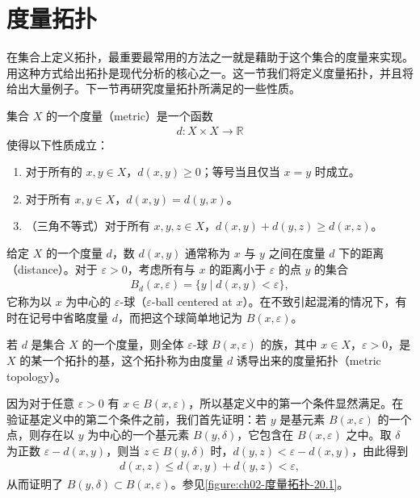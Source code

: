 \documentclass[../../main.tex]{subfiles}
\begin{document}
\section{度量拓扑}\label{section:ch02-度量拓扑}

在集合上定义拓扑，最重要最常用的方法之一就是藉助于这个集合的度量来实现。用这种方式给出拓扑是现代分析的核心之一。这一节我们将定义度量拓扑，并且将给出大量例子。下一节再研究度量拓扑所满足的一些性质。

\begin{definition}\label{definition:ch02-度量}
集合 $X$ 的一个度量（metric）是一个函数
\begin{align*}
d: X \times X \longrightarrow \mathbb{R}
\end{align*}
使得以下性质成立：
\begin{enumerate}[(1)]
\item 对于所有的 $x, y \in X$，$d(x, y) \geqslant 0$；等号当且仅当 $x = y$ 时成立。
\item 对于所有 $x, y \in X$，$d(x, y) = d(y, x)$。
\item （三角不等式）对于所有 $x, y, z \in X$，$d(x, y) + d(y, z) \geqslant d(x, z)$。
\end{enumerate}

给定 $X$ 的一个度量 $d$，数 $d(x, y)$ 通常称为 $x$ 与 $y$ 之间在度量 $d$ 下的距离（distance）。对于 $\varepsilon > 0$，考虑所有与 $x$ 的距离小于 $\varepsilon$ 的点 $y$ 的集合
\begin{align*}
B_{d}(x, \varepsilon) = \{y \mid d(x, y) < \varepsilon\},
\end{align*}
它称为以 $x$ 为中心的 $\varepsilon$-球（$\varepsilon$-ball centered at $x$）。在不致引起混淆的情况下，有时在记号中省略度量 $d$，而把这个球简单地记为 $B(x, \varepsilon)$。

若 $d$ 是集合 $X$ 的一个度量，则全体 $\varepsilon$-球 $B(x, \varepsilon)$ 的族，其中 $x \in X$，$\varepsilon > 0$，是 $X$ 的某一个拓扑的基，这个拓扑称为由度量 $d$ 诱导出来的度量拓扑（metric topology）。
\end{definition}

因为对于任意 $\varepsilon > 0$ 有 $x \in B(x, \varepsilon)$，所以基定义中的第一个条件显然满足。在验证基定义中的第二个条件之前，我们首先证明：若 $y$ 是基元素 $B(x, \varepsilon)$ 的一个点，则存在以 $y$ 为中心的一个基元素 $B(y, \delta)$，它包含在 $B(x, \varepsilon)$ 之中。取 $\delta$ 为正数 $\varepsilon - d(x, y)$，则当 $z \in B(y, \delta)$ 时，$d(y, z) < \varepsilon - d(x, y)$，由此得到
\begin{align*}
d(x, z) \leqslant d(x, y) + d(y, z) < \varepsilon,
\end{align*}
从而证明了 $B(y, \delta) \subset B(x, \varepsilon)$。参见\cref{figure:ch02-度量拓扑-20.1}。
\end{document}
